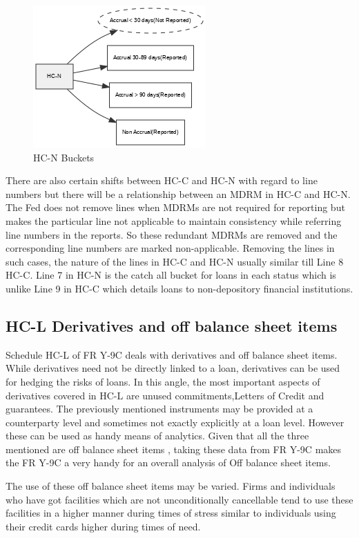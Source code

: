 \documentclass[conference]{IEEEtran}
\begin{document}
	\begin{figure}[htbp]
		\centerline{\includegraphics{hcn_flowchart.png}}
		\caption{HC-N Buckets}
		\label{fig}
	\end{figure}
	
	There are also certain shifts between HC-C and HC-N with regard to line numbers but there will be a relationship between an MDRM in HC-C and HC-N. The Fed does not remove lines when MDRMs are not required for reporting but makes the particular line not applicable to maintain consistency while referring line numbers in the reports. So these redundant MDRMs are removed and the corresponding line numbers are marked non-applicable. Removing the lines in such cases, the nature of the lines in HC-C and HC-N usually similar till Line 8 HC-C. Line 7 in HC-N is the catch all bucket for loans in each status which is unlike Line 9 in HC-C which details loans to non-depository financial institutions.
	
\subsection{HC-L Derivatives and off balance sheet items}
    Schedule HC-L of FR Y-9C deals with derivatives and off balance sheet items. While derivatives need not be directly linked to a loan, derivatives can be used for hedging the risks of loans. In this angle, the most important aspects of derivatives covered in HC-L are unused commitments,Letters of Credit and guarantees. The previously mentioned instruments may be provided at a counterparty level and sometimes not exactly explicitly at a loan level. However these can be used as handy means of analytics. Given that all the three mentioned are off balance sheet items , taking these data from FR Y-9C makes the FR Y-9C a very handy for an overall analysis of Off balance sheet items.
    
    The use of these off balance sheet items may be varied. Firms and individuals who have got facilities which are not unconditionally cancellable tend to use these facilities in a higher manner during times of stress similar to individuals using their credit cards higher during times of need.
    
\end{document}
